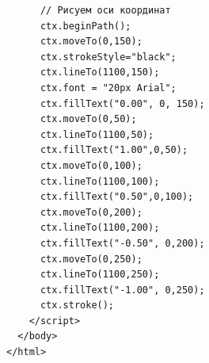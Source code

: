 \begin{verbatim}
      // Рисуем оси координат
      ctx.beginPath();
      ctx.moveTo(0,150);
      ctx.strokeStyle="black";
      ctx.lineTo(1100,150);
      ctx.font = "20px Arial";
      ctx.fillText("0.00", 0, 150);
      ctx.moveTo(0,50);
      ctx.lineTo(1100,50);
      ctx.fillText("1.00",0,50);
      ctx.moveTo(0,100);
      ctx.lineTo(1100,100);
      ctx.fillText("0.50",0,100);
      ctx.moveTo(0,200);
      ctx.lineTo(1100,200);
      ctx.fillText("-0.50", 0,200);
      ctx.moveTo(0,250);
      ctx.lineTo(1100,250);
      ctx.fillText("-1.00", 0,250);
      ctx.stroke();
    </script>
  </body>
</html>
\end{verbatim}
